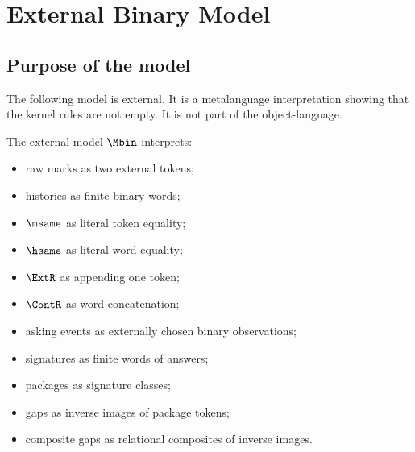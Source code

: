 \chapter{External Binary Model}
\label{ch:core-external-binary-model}

\section{Purpose of the model}
The following model is external. It is a metalanguage interpretation showing that the kernel rules are not empty. It is not part of the object-language.

\begin{definition}
\label{def:external-model-mbin}
The external model \(\Mbin\) interprets:
\begin{itemize}
  \item raw marks as two external tokens;
  \item histories as finite binary words;
  \item \(\msame\) as literal token equality;
  \item \(\hsame\) as literal word equality;
  \item \(\ExtR\) as appending one token;
  \item \(\ContR\) as word concatenation;
  \item asking events as externally chosen binary observations;
  \item signatures as finite words of answers;
  \item packages as signature classes;
  \item gaps as inverse images of package tokens;
  \item composite gaps as relational composites of inverse images.
\end{itemize}
\end{definition}

